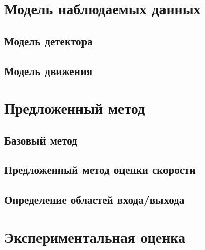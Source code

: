 \section{Модель наблюдаемых данных}
\subsection{Модель детектора}
\subsection{Модель движения}
\section{Предложенный метод}
\subsection{Базовый метод}
\subsection{Предложенный метод оценки скорости}
\subsection{Определение областей входа/выхода}
\section{Экспериментальная оценка}
